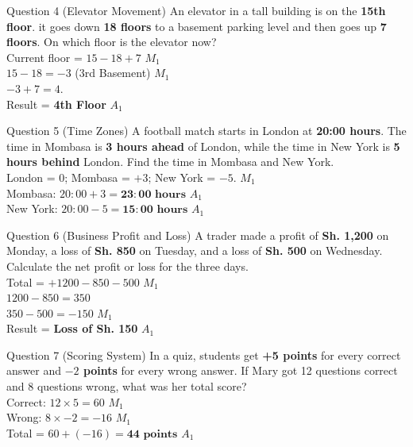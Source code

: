 \documentclass[12pt, a4paper, oneside]{article}
\begin{document}
\begin{solvingbox}{Question 4 (Elevator Movement)}
An elevator in a tall building is on the \textbf{15th floor}. it goes down \textbf{18 floors} to a basement parking level and then goes up \textbf{7 floors}. On which floor is the elevator now? \\
Current floor = $15 - 18 + 7$ \hfill $M_1$ \\
$15 - 18 = -3$ (3rd Basement) \hfill $M_1$ \\
$-3 + 7 = 4$. \\
Result = \textbf{4th Floor} \hfill $A_1$
\end{solvingbox}

\begin{solvingbox}{Question 5 (Time Zones)}
A football match starts in London at \textbf{20:00 hours}. The time in Mombasa is \textbf{3 hours ahead} of London, while the time in New York is \textbf{5 hours behind} London. Find the time in Mombasa and New York. \\
London = 0; Mombasa = $+3$; New York = $-5$. \hfill $M_1$ \\
Mombasa: $20:00 + 3 = \mathbf{23:00\text{ hours}}$ \hfill $A_1$ \\
New York: $20:00 - 5 = \mathbf{15:00\text{ hours}}$ \hfill $A_1$
\end{solvingbox}

\begin{solvingbox}{Question 6 (Business Profit and Loss)}
A trader made a profit of \textbf{Sh. 1,200} on Monday, a loss of \textbf{Sh. 850} on Tuesday, and a loss of \textbf{Sh. 500} on Wednesday. Calculate the net profit or loss for the three days. \\
Total = $+1200 - 850 - 500$ \hfill $M_1$ \\
$1200 - 850 = 350$ \\
$350 - 500 = -150$ \hfill $M_1$ \\
Result = \textbf{Loss of Sh. 150} \hfill $A_1$
\end{solvingbox}

\begin{solvingbox}{Question 7 (Scoring System)}
In a quiz, students get \textbf{+5 points} for every correct answer and \textbf{$-2$ points} for every wrong answer. If Mary got 12 questions correct and 8 questions wrong, what was her total score? \\
Correct: $12 \times 5 = 60$ \hfill $M_1$ \\
Wrong: $8 \times -2 = -16$ \hfill $M_1$ \\
Total = $60 + (-16) = \mathbf{44\text{ points}}$ \hfill $A_1$
\end{solvingbox}
\end{document}
